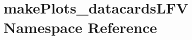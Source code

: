 \hypertarget{namespacemakePlots__datacardsLFV}{
\section{makePlots\_\-datacardsLFV Namespace Reference}
\label{namespacemakePlots__datacardsLFV}
}
